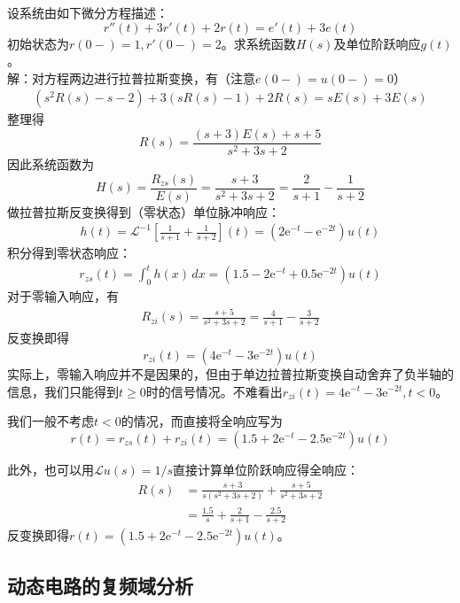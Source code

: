 \begin{example}[常系数线性微分方程]
    设系统由如下微分方程描述：
    \[r''(t)+3r'(t)+2r(t)=e'(t)+3e(t)\]
    初始状态为$r(0-)=1,r'(0-)=2$。求系统函数$H(s)$及单位阶跃响应$g(t)$。\\
    解：对方程两边进行拉普拉斯变换，有（注意$e(0-)=u(0-)=0$）
    \begin{align*}
        \left(s^2 R(s)-s-2\right)+3\left(s R(s)-1\right)+2 R(s)=sE(s)+3E(s)
    \end{align*}
    整理得
    \[R(s)=\frac{(s+3)E(s)+s+5}{s^2+3s+2}\]
    因此系统函数为
    \[H(s)=\frac{R_{zs}(s)}{E(s)}=\frac{s+3}{s^2+3s+2}=\frac{2}{s+1}-\frac{1}{s+2}\]
    做拉普拉斯反变换得到（零状态）单位脉冲响应：
    \begin{align*}
        h(t)=\mathcal{L}^{-1} \left[\frac{1}{s+1}+\frac{1}{s+2}\right](t)=(2\mathrm{e}^{-t}-\mathrm{e}^{-2t})u(t)
    \end{align*}
    积分得到零状态响应：
    \begin{align*}
    r_{zs}(t)=\int_0^{t}h(x)\,dx=(1.5-2\mathrm{e}^{-t}+0.5\mathrm{e}^{-2t})u(t)
    \end{align*}
    对于零输入响应，有
    \begin{align*}
        R_{zi}(s)=\frac{s+5}{s^2+3s+2}=\frac{4}{s+1}-\frac{3}{s+2}
    \end{align*}
    反变换即得$$r_{zi}(t)=(4\mathrm{e}^{-t}-3\mathrm{e}^{-2t})u(t)$$
    实际上，零输入响应并不是因果的，但由于单边拉普拉斯变换自动舍弃了负半轴的信息，我们只能得到$t\geq 0$时的信号情况。不难看出$r_{zi}(t)=4\mathrm{e}^{-t}-3\mathrm{e}^{-2t},t<0$。

    我们一般不考虑$t<0$的情况，而直接将全响应写为
    $$r(t)=r_{zs}(t)+r_{zi}(t)=(1.5+2\mathrm{e}^{-t}-2.5\mathrm{e}^{-2t})u(t)$$

    此外，也可以用$\mathcal{L} u(s)=1/s$直接计算单位阶跃响应得全响应：
    \begin{align*}
        R(s)&=\frac{s+3}{s(s^2+3s+2)}+\frac{s+5}{s^2+3s+2}\\
        &=\frac{1.5}{s}+\frac{2}{s+1}-\frac{2.5}{s+2}
    \end{align*}
    反变换即得$r(t)=(1.5+2\mathrm{e}^{-t}-2.5\mathrm{e}^{-2t})u(t)$。
\end{example}

\subsection{动态电路的复频域分析}\label{sub:laplace_circuit}

